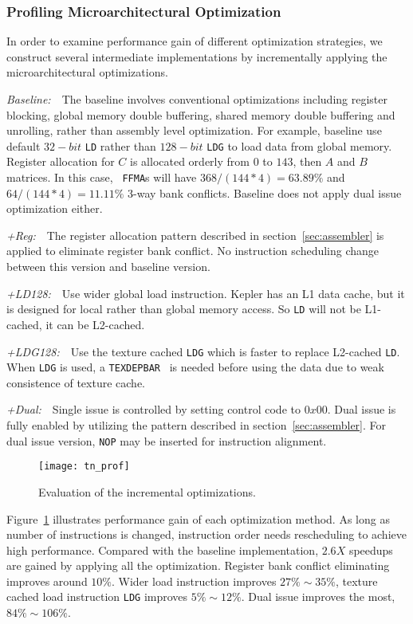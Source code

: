 \subsubsection{Profiling Microarchitectural Optimization}
In order to examine performance gain of different optimization strategies, we construct several intermediate implementations by incrementally applying the microarchitectural optimizations.

{\it Baseline:}~~The baseline involves conventional optimizations including register blocking, global
memory double buffering, shared memory double buffering and unrolling, rather than assembly level optimization.
For example, baseline use default $32-bit$ {\tt LD} rather than $128-bit$ {\tt LDG} to load data from global memory.
Register allocation for $C$ is allocated orderly from $0$ to $143$, then $A$ and $B$ matrices. In this case, {\tt
FFMA}s will have $368/(144*4)=63.89\%$ and $64/(144*4)=11.11\%$ 3-way bank conflicts. Baseline does not apply dual
issue optimization either.

{\it +Reg:}~~The register allocation pattern described in section~\ref{sec:assembler} is applied to eliminate register bank conflict. No
instruction scheduling change between this version and baseline version.

{\it +LD128:}~~Use wider global load instruction.
Kepler has an L1 data cache, but it is designed for local rather than global memory access. So {\tt LD} will not be L1-cached, it can be L2-cached.

{\it +LDG128:}~~Use the texture cached {\tt LDG} which is faster to replace L2-cached {\tt LD}. When {\tt LDG} is used, a {\tt TEXDEPBAR}~\cite{lukyanov2014efficient} is needed before using the data due to weak consistence of texture cache.

{\it +Dual:}~~Single issue is controlled by setting control code to $0x00$. Dual issue is fully enabled by utilizing the
pattern described in section~\ref{sec:assembler}. For dual issue version, {\tt NOP} may be inserted for instruction alignment.

\begin{figure}[htbp]
\begin{center}
\texttt{[image: tn\_prof]}
    \caption{Evaluation of the incremental optimizations.}
\label{fig:th_prof}
\end{center}
\end{figure}

Figure~\ref{fig:th_prof} illustrates performance gain of each optimization method.
As long as number of instructions is changed, instruction order needs rescheduling to achieve high performance.
Compared with the baseline implementation, $2.6X$ speedups are gained by applying all the optimization.
Register bank conflict eliminating improves around $10\%$. Wider load instruction improves $27\%\sim35\%$, texture cached
load instruction {\tt LDG} improves $5\%\sim12\%$. Dual issue improves the most, $84\%\sim106\%$.

